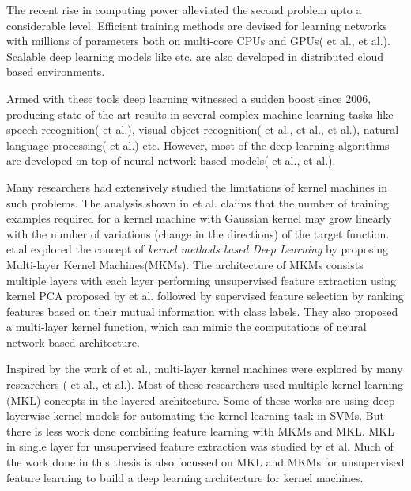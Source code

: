 The recent rise in computing power alleviated the second problem upto a considerable level. Efficient training methods are devised for learning networks with millions of parameters both on multi-core CPUs and GPUs(\cite{gpu1} et al., \cite{gpu2} et al.). Scalable deep learning models like \cite{graphlab} etc. are also developed in distributed cloud based environments.

Armed with these tools deep learning witnessed a sudden boost since 2006, producing state-of-the-art results in several complex machine learning tasks like speech recognition(\cite{speechBest} et al.), visual object recognition(\cite{imagenet} et al., \cite{cifarBest} et al., \cite{mnistBest} et al.), natural language processing(\cite{nlpBest} et al.) etc. However, most of the deep learning algorithms are developed on top of neural network based models(\cite{lecunnCNN} et al., \cite{hintonDBN} et al.). 

Many researchers had extensively studied the limitations of kernel machines in such problems. The analysis shown in \cite{bengioAI} et al. claims that the number of training examples required for a kernel machine with Gaussian kernel may grow linearly with the number of variations (change in the directions) of the target function. \cite{saul} et.al explored the concept of \textit{kernel methods based Deep Learning} by proposing Multi-layer Kernel Machines(MKMs). The architecture of MKMs consists multiple layers with each layer performing unsupervised feature extraction using kernel PCA proposed by \cite{kpca} et al. followed by supervised feature selection by ranking features based on their mutual information with class labels. They also proposed a multi-layer kernel function, which can mimic the computations of neural network based architecture.

Inspired by the work of \cite{saul} et al., multi-layer kernel machines were explored  by many researchers (\cite{2l_mkl} et al., \cite{deep_mkl} et al.). Most of these researchers used multiple kernel learning (MKL) concepts in the layered architecture. Some of these works are using deep layerwise kernel models for automating the kernel learning task in SVMs. But there is less work done combining feature learning with MKMs and MKL. MKL in single layer for unsupervised feature extraction was studied by \cite{zhuang} et al. Much of the work done in this thesis is also focussed on MKL and MKMs for unsupervised feature learning to build a deep learning architecture for kernel machines.

